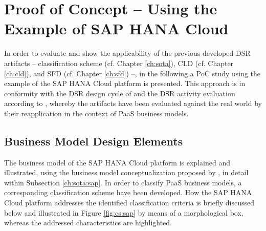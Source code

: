 \chapter{Proof of Concept -- Using the Example of SAP HANA Cloud}\label{ch:poc}

In order to evaluate and show the applicability of the previous developed \ac{DSR} artifacts -- classification scheme (cf. Chapter \ref{ch:sota}), \ac{CLD} (cf. Chapter \ref{ch:cld}), and \ac{SFD} (cf. Chapter \ref{ch:sfd}) --, in the following a \acf{PoC} study using the example of the SAP HANA Cloud platform is presented. This approach is in conformity with the \ac{DSR} design cycle of \citet[pp. 88,90-91]{Hevner2007} and the \ac{DSR} activity evaluation according to \citet[p. 56]{Peffers2007}, whereby the artifacts have been evaluated against the real world by their reapplication in the context of \ac{PaaS} business models.

\section{Business Model Design Elements}\label{ch:poc:cs}
The business model of the SAP HANA Cloud platform is explained and illustrated, using the business model conceptualization proposed by \citet{Johnson2008}, in detail within Subsection \ref{ch:sota:sap}. In order to classify \ac{PaaS} business models, a corresponding classification scheme have been developed. How the SAP HANA Cloud platform addresses the identified classification criteria is briefly discussed below and illustrated in Figure \ref{fig:cs:sap} by means of a morphological box, whereas the addressed characteristics are highlighted.

